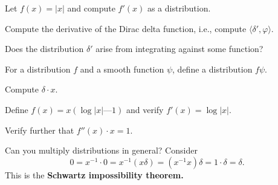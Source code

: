 \documentclass{homework}
\begin{document}
\vfill

\begin{problem}
  Let $f(x) = |x|$ and compute $f'(x)$ as a distribution.
\end{problem}

\vfill

\begin{problem}
  Compute the derivative of the Dirac delta function, i.e.,
  compute $\langle \delta', \varphi \rangle$.
\end{problem}

\vfill

\begin{problem}
  Does the distribution $\delta'$ arise from integrating against some function?
\end{problem}

\vfill

\begin{problem}
  For a distribution $f$ and a smooth function $\psi$, define a distribution $f \psi$.
\end{problem}

\vfill

\begin{problem}
  Compute $\delta \cdot x$.
\end{problem}

\vfill

\begin{problem}
  Define $f(x) = x (\log   |x|  — 1)$ and verify $f'(x) = \log |x|$.
\end{problem}

\vfill


\begin{problem}
  Verify further that $f''(x) \cdot x = 1$.
\end{problem}

\vfill


\begin{problem}
  Can you multiply distributions in general?  Consider
  \[
    0 = x^{-1} \cdot 0 = x^{-1} (x \delta) = (x^{-1} x) \delta = 1 \cdot \delta = \delta.
  \]
  This is the \textbf{Schwartz impossibility theorem.}
\end{problem}

\vfill


  
\end{document}
